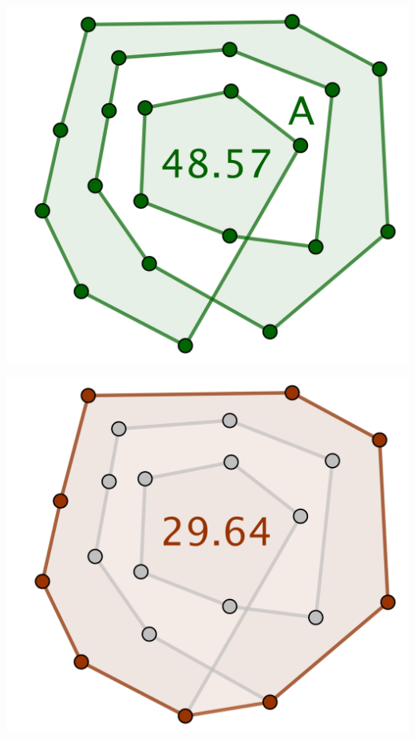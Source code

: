 \begin{multicols}{2}
	\small\itshape\centering
	\includegraphics[scale=.3]{content/polygon/alg-area/alg-area-ncycle-not-opti-pb-1.png}

	\includegraphics[scale=.3]{content/polygon/alg-area/alg-area-ncycle-not-opti-pb-2.png}
\end{multicols}




